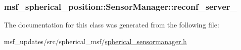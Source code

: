 \hypertarget{classmsf__spherical__position_1_1SensorManager_a121dcb0786d2a10509caa5b901a04dff}{
\subsubsection[{reconf\-\_\-server\-\_\-}]{ msf\-\_\-spherical\-\_\-position\-::\-Sensor\-Manager\-::reconf\-\_\-server\-\_\-\hspace{0.3cm}{\ttfamily [private]}}}\label{classmsf__spherical__position_1_1SensorManager_a121dcb0786d2a10509caa5b901a04dff}


The documentation for this class was generated from the following file\-:\begin{DoxyCompactItemize}
\item 
msf\-\_\-updates/src/spherical\-\_\-msf/\hyperlink{spherical__sensormanager_8h}{spherical\-\_\-sensormanager.\-h}\end{DoxyCompactItemize}
